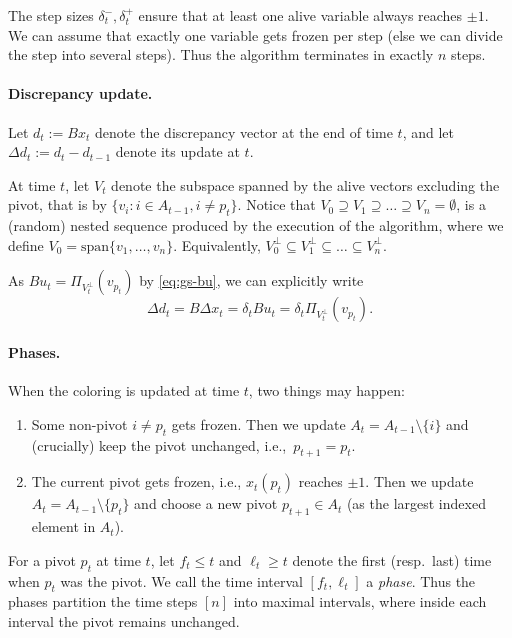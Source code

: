 The step sizes $\delta_t^-,\delta_t^+$  ensure that at least one alive variable always reaches $\pm 1$.
We can assume that exactly one variable gets frozen per step (else we can divide the step into several steps). Thus the algorithm terminates in exactly $n$ steps. 

\paragraph{Discrepancy update.} Let $d_t := Bx_t$ denote the discrepancy vector at the end of time $t$, and let
$\Delta d_t := d_t - d_{t-1}$ denote its update at $t$.

At time $t$, let $V_t$ denote the subspace spanned by the alive vectors excluding the pivot, that is by $\{ v_i:i \in A_{t-1}, i \neq  p_t\}$. 
Notice that $V_0 \supseteq V_1 \supseteq \ldots \supseteq V_n = \emptyset$, is a (random) nested sequence produced by the execution of the algorithm, where we define $V_0= \text{span}\{v_1,\ldots,v_n\}$.
Equivalently, $V_0^\perp \subseteq V_1^\perp \subseteq \ldots \subseteq V_n^\perp$.

As $Bu_t = \Pi_{V_t^\perp}(v_{p_t})$ by \eqref{eq:gs-bu}, we can explicitly write
\begin{equation}
\label{eq:gs-disc-update-explicit1}
    \Delta d_t = B \Delta x_t =  \delta_t  B u_t = \delta_t \Pi_{V_t^\perp}(v_{p_t}). 
\end{equation} 

\paragraph{Phases.}
When the coloring is updated at time $t$, two things may happen:
\begin{enumerate}
    \item 
 Some non-pivot $i \neq p_t$ gets frozen. Then we update $A_t = A_{t-1}\setminus \{i\}$ and (crucially) keep the pivot unchanged, i.e.,~$p_{t+1}=p_t$.
    \item The current pivot gets frozen, i.e., $x_{t}(p_t)$ reaches $\pm 1$. Then we update $A_t =A_{t-1}\setminus \{p_t\}$ and choose a new pivot $p_{t+1} \in A_{t}$ (as the largest indexed element in $A_t$).
\end{enumerate}

For a pivot $p_t$ at time $t$, let $f_t\leq t$ and $\ell_t \geq t$
denote the first (resp.~last) time when $p_t$ was the pivot. We call
the time interval $[f_t,\ell_t]$ a {\em phase}. Thus the phases
partition the time steps $[n]$ into maximal intervals, where inside
each interval the pivot remains unchanged. 

